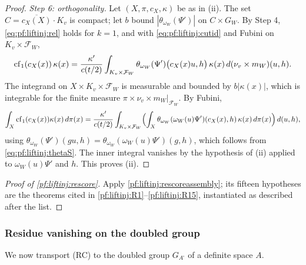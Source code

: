 \begin{proof}
\emph{Step 6: orthogonality.} Let $(X,\pi,c_X,\kappa)$ be as in (ii). The set $C=\overline{c_X(X)}\cdot K_v$ is compact; let $b$ bound
$|\theta_{\omega_W}(\Psi')|$ on $C\times G_W$. By Step 4, \eqref{eq:pf:liftinj:rel} holds for $k=1$, and with \eqref{eq:pf:liftinj:cutid} and
Fubini on $K_v\times\mathcal F_W$,
\[
\operatorname{cf}_1(c_X(x))\,\kappa(x)=\frac{\kappa'}{c(t/2)}\int_{K_v\times\mathcal F_W}
\theta_{\omega_W}(\Psi')\bigl(c_X(x)u,h\bigr)\,\kappa(x)\,d(\nu_v\times m_W)(u,h).
\]
The integrand on $X\times K_v\times\mathcal F_W$ is measurable and bounded by $b|\kappa(x)|$, which is integrable for the finite measure
$\pi\times\nu_v\times m_W|_{\mathcal F_W}$. By Fubini,
\[
\int_X\operatorname{cf}_1(c_X(x))\kappa(x)\,d\pi(x)=\frac{\kappa'}{c(t/2)}\int_{K_v\times\mathcal F_W}
\Bigl(\int_X\theta_{\omega_W}(\omega_W(u)\Psi')(c_X(x),h)\,\kappa(x)\,d\pi(x)\Bigr)\,d(u,h),
\]
using $\theta_{\omega_W}(\Psi')(gu,h)=\theta_{\omega_W}(\omega_W(u)\Psi')(g,h)$, which follows from \eqref{eq:pf:liftinj:thetaS}. The inner integral
vanishes by the hypothesis of (ii) applied to $\omega_W(u)\Psi'$ and $h$. This proves (ii).
\end{proof}

\begin{proof}[Proof of \cref{pf:liftinj:rescore}]
Apply \cref{pf:liftinj:rescoreassembly}; its fifteen hypotheses are the theorems cited in \ref{pf:liftinj:R1}--\ref{pf:liftinj:R15}, instantiated
as described after the list.
\end{proof}

\subsubsection{Residue vanishing on the doubled group}\label{sec:pf:liftinj:resvansec}

We now transport (RC) to the doubled group $G_{A^\square}$ of a definite space $A$.

